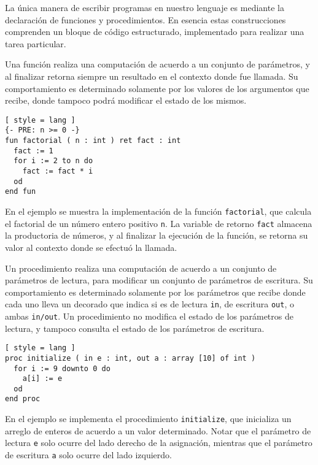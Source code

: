 La única manera de escribir programas en nuestro lenguaje es mediante la declaración de funciones y procedimientos.
En esencia estas construcciones comprenden un bloque de código estructurado, implementado para realizar una tarea particular.

Una función realiza una computación de acuerdo a un conjunto de parámetros, y al finalizar retorna siempre un resultado en el contexto donde fue llamada.
Su comportamiento es determinado solamente por los valores de los argumentos que recibe, donde tampoco podrá modificar el estado de los mismos.

\begin{lstlisting}[ style = lang ]
{- PRE: n >= 0 -}
fun factorial ( n : int ) ret fact : int
  fact := 1
  for i := 2 to n do
    fact := fact * i
  od
end fun
\end{lstlisting}

En el ejemplo se muestra la implementación de la función \lstinline[style = lang]{factorial}, que calcula el factorial de un número entero positivo \lstinline[style = lang]{n}.
La variable de retorno \lstinline[style = lang]{fact} almacena la productoria de números, y al finalizar la ejecución de la función, se retorna su valor al contexto donde se efectuó la llamada.

Un procedimiento realiza una computación de acuerdo a un conjunto de parámetros de lectura, para modificar un conjunto de parámetros de escritura.
Su comportamiento es determinado solamente por los parámetros que recibe donde cada uno lleva un decorado que indica si es de lectura \lstinline[style = lang]{in}, de escritura \lstinline[style = lang]{out}, o ambas \lstinline[style = lang]{in/out}.
Un procedimiento no modifica el estado de los parámetros de lectura, y tampoco consulta el estado de los parámetros de escritura.

\begin{lstlisting}[ style = lang ]
proc initialize ( in e : int, out a : array [10] of int )
  for i := 9 downto 0 do
    a[i] := e
  od
end proc
\end{lstlisting}

En el ejemplo se implementa el procedimiento \lstinline[style = lang]{initialize}, que inicializa un arreglo de enteros de acuerdo a un valor determinado.
Notar que el parámetro de lectura \lstinline[style = lang]{e} solo ocurre del lado derecho de la asignación, mientras que el parámetro de escritura \lstinline[style = lang]{a} solo ocurre del lado izquierdo.

